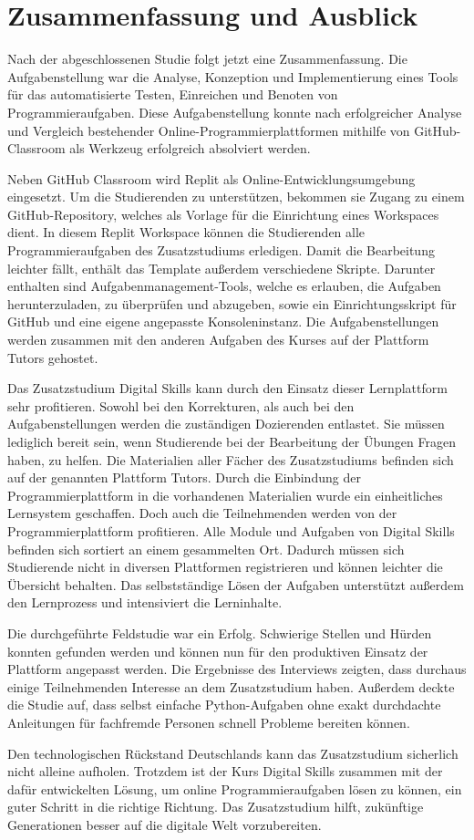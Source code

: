 \section{Zusammenfassung und Ausblick}\label{zusammenfassung-u-ausblick}
Nach der abgeschlossenen Studie folgt jetzt eine Zusammenfassung. Die
Aufgabenstellung war die Analyse, Konzeption und Implementierung eines Tools
für das automatisierte Testen, Einreichen und Benoten von Programmieraufgaben.
Diese Aufgabenstellung konnte nach erfolgreicher Analyse und Vergleich
bestehender Online-Programmierplattformen mithilfe von GitHub-Classroom als
Werkzeug erfolgreich absolviert werden.

Neben GitHub Classroom wird Replit als Online-Entwicklungsumgebung eingesetzt.
Um die Studierenden zu unterstützen, bekommen sie Zugang zu einem
GitHub-Repository, welches als Vorlage für die Einrichtung eines Workspaces
dient. In diesem Replit Workspace können die Studierenden alle
Programmieraufgaben des Zusatzstudiums erledigen. Damit die Bearbeitung leichter
fällt, enthält das Template außerdem verschiedene Skripte. Darunter enthalten
sind Aufgabenmanagement-Tools, welche es erlauben, die Aufgaben herunterzuladen,
zu überprüfen und abzugeben, sowie ein Einrichtungsskript für GitHub und eine
eigene angepasste Konsoleninstanz. Die Aufgabenstellungen werden zusammen mit
den anderen Aufgaben des Kurses auf der Plattform Tutors gehostet.

Das Zusatzstudium Digital Skills kann durch den Einsatz dieser
Lernplattform sehr profitieren. Sowohl bei den Korrekturen, als auch bei den 
Aufgabenstellungen werden die zuständigen Dozierenden entlastet. Sie müssen
lediglich bereit sein, wenn Studierende bei der Bearbeitung der Übungen Fragen
haben, zu helfen. Die Materialien aller Fächer des Zusatzstudiums befinden sich
auf der genannten Plattform Tutors. Durch die Einbindung der
Programmierplattform in die vorhandenen Materialien wurde ein einheitliches
Lernsystem geschaffen. Doch auch die Teilnehmenden werden von der
Programmierplattform profitieren. Alle Module und Aufgaben von Digital Skills
befinden sich sortiert an einem gesammelten Ort. Dadurch müssen sich Studierende
nicht in diversen Plattformen registrieren und können leichter die Übersicht
behalten. Das selbstständige Lösen der Aufgaben unterstützt außerdem den
Lernprozess und intensiviert die Lerninhalte.

Die durchgeführte Feldstudie war ein Erfolg. Schwierige Stellen und Hürden
konnten gefunden werden und können nun für den produktiven Einsatz der Plattform
angepasst werden. Die Ergebnisse des Interviews zeigten, dass durchaus einige
Teilnehmenden Interesse an dem Zusatzstudium haben. Außerdem deckte die Studie
auf, dass selbst einfache Python-Aufgaben ohne exakt durchdachte Anleitungen
für fachfremde Personen schnell Probleme bereiten können.

Den technologischen Rückstand Deutschlands kann das Zusatzstudium sicherlich
nicht alleine aufholen. Trotzdem ist der Kurs Digital Skills zusammen mit der
dafür entwickelten Lösung, um online Programmieraufgaben lösen zu können, ein
guter Schritt in die richtige Richtung. Das Zusatzstudium hilft, zukünftige
Generationen besser auf die digitale Welt vorzubereiten.